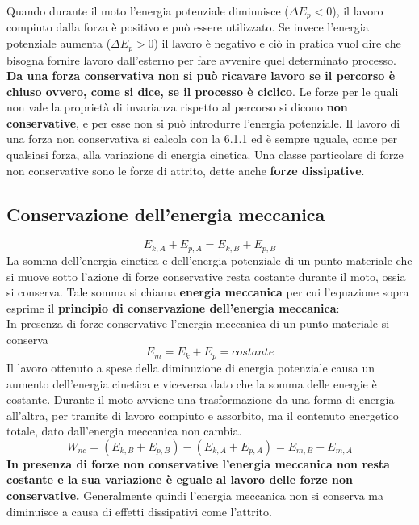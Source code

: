 \documentclass{article}
\numberwithin{equation}{subsection}
\begin{document}
Quando durante il moto l'energia potenziale diminuisce ($\Delta E_p<0$), il lavoro compiuto dalla forza è positivo e può essere utilizzato. Se invece l'energia potenziale aumenta ($\Delta E_p>0$) il lavoro è negativo e ciò in pratica vuol dire che bisogna fornire lavoro dall'esterno per fare avvenire quel determinato processo. \textbf{Da una forza conservativa non si può ricavare lavoro se il percorso è chiuso ovvero, come si dice, se il processo è ciclico}. Le forze per le quali non vale la proprietà di invarianza rispetto al percorso si dicono \textbf{non conservative}, e per esse non si può introdurre l'energia potenziale. Il lavoro di una forza non conservativa si calcola con la 6.1.1 ed è sempre uguale, come per qualsiasi forza, alla variazione di energia cinetica. Una classe particolare di forze non conservative sono le forze di attrito, dette anche \textbf{forze dissipative}.
\subsection{Conservazione dell'energia meccanica}
\begin{equation}
    E_{k,A}+E_{p,A}=E_{k,B}+E_{p,B}
\end{equation}
La somma dell'energia cinetica e dell'energia potenziale di un punto materiale che si muove sotto l'azione di forze conservative resta costante durante il moto, ossia si conserva. Tale somma si chiama \textbf{energia meccanica} per cui l'equazione sopra esprime il \textbf{principio di conservazione dell'energia meccanica}:\\
In presenza di forze conservative l'energia meccanica di un punto materiale si conserva
\begin{equation}
    E_m=E_k+E_p=costante
\end{equation}
Il lavoro ottenuto a spese della diminuzione di energia potenziale causa un aumento dell'energia cinetica e viceversa dato che la somma delle energie è costante. Durante il moto avviene una trasformazione da una forma di energia all'altra, per tramite di lavoro compiuto e assorbito, ma il contenuto energetico totale, dato dall'energia meccanica non cambia.
\begin{equation}
    W_{nc}=(E_{k,B}+E_{p,B})-(E_{k,A}+E_{p,A})=E_{m,B}-E_{m,A}
\end{equation}
\textbf{In presenza di forze non conservative l'energia meccanica non resta costante e la sua variazione è eguale al lavoro delle forze non conservative.} Generalmente quindi l'energia meccanica non si conserva ma diminuisce a causa di effetti dissipativi come l'attrito.
\end{document}
